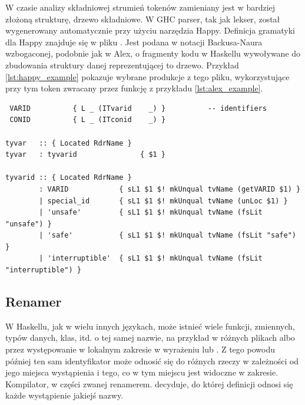 W czasie analizy składniowej strumień tokenów zamieniany jest w bardziej złożoną
strukturę, drzewo składniowe. W GHC parser, tak jak lekser, został wygenerowany
automatycznie przy użyciu narzędzia Happy. Definicja gramatyki dla Happy
znajduje się w pliku . Jest podana w notacji Backusa-Naura
wzbogaconej, podobnie jak w Alex, o fragmenty kodu w Haskellu wywoływane do
zbudowania struktury danej reprezentującej to drzewo\cite{DocsHappy}. Przykład
\ref{lst:happy_example} pokazuje wybrane produkcje z tego pliku, wykorzystujące
przy tym token  zwracany przez funkcję  z przykładu
\ref{lst:alex_example}.
{
\begin{lstlisting}[float,label={lst:happy_example},
                   caption={Wycinki z pliku \code{Parser.y} z produkcjami odpowiadającymi za zmienne typów, wykorzystujące tokeny, których dotyczył przykład \ref{lst:alex_example}.}]
%token
 VARID          { L _ (ITvarid    _) }          -- identifiers
 CONID          { L _ (ITconid    _) }

tyvar   :: { Located RdrName }
tyvar   : tyvarid               { $1 }

tyvarid :: { Located RdrName }
        : VARID            { sL1 $1 $! mkUnqual tvName (getVARID $1) }
        | special_id       { sL1 $1 $! mkUnqual tvName (unLoc $1) }
        | 'unsafe'         { sL1 $1 $! mkUnqual tvName (fsLit "unsafe") }
        | 'safe'           { sL1 $1 $! mkUnqual tvName (fsLit "safe") }
        | 'interruptible'  { sL1 $1 $! mkUnqual tvName (fsLit "interruptible") }
\end{lstlisting}

\subsection{Renamer}\label{sec:renamer}

W Haskellu, jak w wielu innych językach, może istnieć wiele funkcji, zmiennych,
typów danych, klas, itd. o tej samej nazwie, na przykład w różnych plikach albo
przez występowanie w lokalnym zakresie w wyrażeniu  lub
. Z tego powodu później ten sam identyfikator może odnosić się do
różnych rzeczy w zależności od jego miejsca wystąpienia i tego, co w tym miejscu
jest widoczne w zakresie. Kompilator, w części zwanej renamerem. decyduje, do
której definicji odnosi się każde wystąpienie jakiejś nazwy.

}
